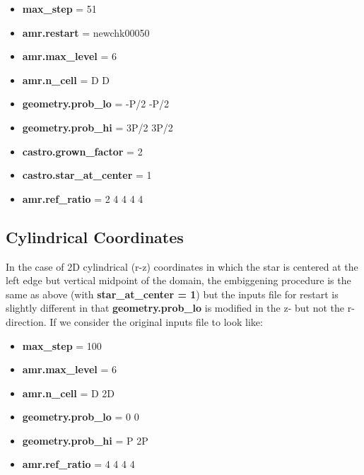 \begin{itemize}

\item {\bf max\_step}      = 51

\item {\bf amr.restart} = newchk00050

\item {\bf amr.max\_level} = 6

\item {\bf amr.n\_cell}    = D D

\item {\bf geometry.prob\_lo} = -P/2  -P/2

\item {\bf geometry.prob\_hi} = 3P/2  3P/2

\item {\bf castro.grown\_factor} = 2

\item {\bf castro.star\_at\_center} = 1

\item {\bf amr.ref\_ratio}    = 2 4 4 4 4

\end{itemize}

\subsection{Cylindrical Coordinates}

In the case of 2D cylindrical (r-z) coordinates in which the star is centered at the left edge
but vertical midpoint of the domain, the embiggening procedure is the same as above
(with {\bf star\_at\_center = 1}) but the inputs file for restart is slightly different in that
{\bf geometry.prob\_lo} is modified in the z- but not the r-direction.   If we consider the original
inputs file to look like:

\begin{itemize}

\item {\bf max\_step}      = 100

\item {\bf amr.max\_level} = 6

\item {\bf amr.n\_cell}    = D 2D

\item {\bf geometry.prob\_lo} = 0 0

\item {\bf geometry.prob\_hi} = P 2P

\item {\bf amr.ref\_ratio}    = 4 4 4 4

\end{itemize}

